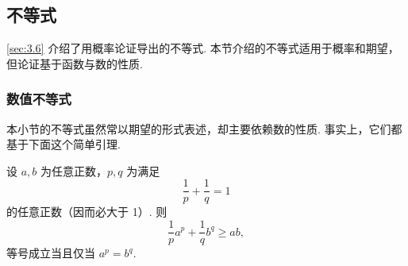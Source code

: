 \subsection{不等式}\label{sec:4.7}
\autoref{sec:3.6} 介绍了用概率论证导出的不等式. 本节介绍的不等式适用于概率和期望，但论证基于函数与数的性质.
\subsubsection{数值不等式}\label{sec:4.7.1}
本小节的不等式虽然常以期望的形式表述，却主要依赖数的性质. 事实上，它们都基于下面这个简单引理.
\begin{lemma}\label{lem:4.7.1}
设 $a,b$ 为任意正数，$p,q$ 为满足
\begin{equation}\label{eq:4.7.1}
\frac1p+\frac1q=1
\end{equation}
的任意正数（因而必大于 1）. 则
\begin{equation}\label{eq:4.7.2}
\frac1pa^p+\frac1qb^q\ge ab,
\end{equation}
等号成立当且仅当 $a^p=b^q$.
\end{lemma}

